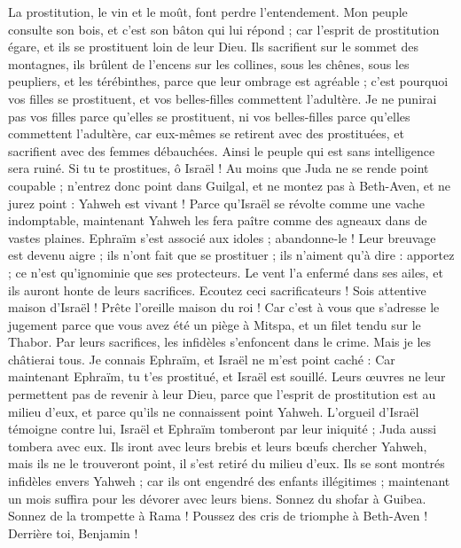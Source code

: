 \begin{multicols}{2}
La prostitution, le vin et le moût, font perdre l'entendement.
Mon peuple consulte son bois, et c’est son bâton qui lui répond ; car l'esprit de prostitution égare, et ils se prostituent loin de leur Dieu.
Ils sacrifient sur le sommet des montagnes, ils brûlent de l’encens sur les collines, sous les chênes, sous les peupliers, et les térébinthes, parce que leur ombrage est agréable ; c'est pourquoi vos filles se prostituent, et vos belles-filles commettent l'adultère.
Je ne punirai pas vos filles parce qu’elles se prostituent, ni vos belles-filles parce qu’elles commettent l’adultère, car eux-mêmes se retirent avec des prostituées, et sacrifient avec des femmes débauchées. Ainsi le peuple qui est sans intelligence sera ruiné.
Si tu te prostitues, ô Israël ! Au moins que Juda ne se rende point coupable ; n'entrez donc point dans Guilgal, et ne montez pas à Beth-Aven, et ne jurez point : Yahweh est vivant !
Parce qu'Israël se révolte comme une vache indomptable, maintenant Yahweh les fera paître comme des agneaux dans de vastes plaines.
Ephraïm s'est associé aux idoles ; abandonne-le !
Leur breuvage est devenu aigre ; ils n'ont fait que se prostituer ; ils n'aiment qu'à dire : apportez ; ce n'est qu'ignominie que ses protecteurs.
Le vent l'a enfermé dans ses ailes, et ils auront honte de leurs sacrifices.
\VerseOne{}Ecoutez ceci sacrificateurs ! Sois attentive maison d'Israël ! Prête l'oreille maison du roi ! Car c’est à vous que s’adresse le jugement parce que vous avez été un piège à Mitspa, et un filet tendu sur le Thabor.
Par leurs sacrifices, les infidèles s’enfoncent dans le crime. Mais je les châtierai tous.
Je connais Ephraïm, et Israël ne m'est point caché : Car maintenant Ephraïm, tu t’es prostitué, et Israël est souillé.
Leurs œuvres ne leur permettent pas de revenir à leur Dieu, parce que l'esprit de prostitution est au milieu d'eux, et parce qu’ils ne connaissent point Yahweh.
L’orgueil d'Israël témoigne contre lui, Israël et Ephraïm tomberont par leur iniquité ; Juda aussi tombera avec eux.
Ils iront avec leurs brebis et leurs bœufs chercher Yahweh, mais ils ne le trouveront point, il s'est retiré du milieu d’eux.
Ils se sont montrés infidèles envers Yahweh ; car ils ont engendré des enfants illégitimes ; maintenant un mois suffira pour les dévorer avec leurs biens.
Sonnez du shofar à Guibea. Sonnez de la trompette à Rama ! Poussez des cris de triomphe à Beth-Aven ! Derrière toi, Benjamin !

\end{multicols}

